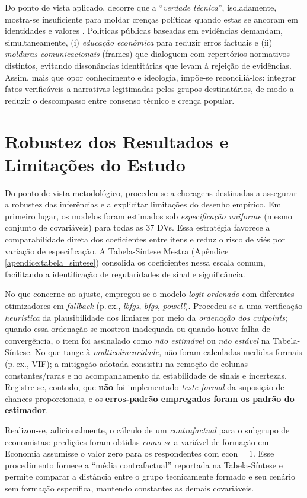 Do ponto de vista aplicado, decorre que a ``\textit{verdade técnica}'', isoladamente, mostra-se insuficiente para moldar crenças políticas quando estas se ancoram em identidades e valores \cite{westen2007political}. Políticas públicas baseadas em evidências demandam, simultaneamente, (i) \textit{educação econômica} para reduzir erros factuais e (ii) \textit{molduras comunicacionais} (frames) que dialoguem com repertórios normativos distintos, evitando dissonâncias identitárias que levam à rejeição de evidências. Assim, mais que opor conhecimento e ideologia, impõe-se reconciliá-los: integrar fatos verificáveis a narrativas legitimadas pelos grupos destinatários, de modo a reduzir o descompasso entre consenso técnico e crença popular.

\section{Robustez dos Resultados e Limitações do Estudo}
Do ponto de vista metodológico, procedeu-se a checagens destinadas a assegurar a robustez das inferências e a explicitar limitações do desenho empírico. Em primeiro lugar, os modelos foram estimados sob \textit{especificação uniforme} (mesmo conjunto de covariáveis) para todas as 37 DVs. Essa estratégia favorece a comparabilidade direta dos coeficientes entre itens e reduz o risco de viés por variação de especificação. A Tabela-Síntese Mestra (Apêndice \autoref{apendice:tabela_sintese}) consolida os coeficientes nessa escala comum, facilitando a identificação de regularidades de sinal e significância.

No que concerne ao ajuste, empregou-se o modelo \textit{logit ordenado} com diferentes otimizadores em \textit{fallback} (p.\,ex., \textit{lbfgs}, \textit{bfgs}, \textit{powell}). Procedeu-se a uma verificação \textit{heurística} da plausibilidade dos limiares por meio da \textit{ordenação dos cutpoints}; quando essa ordenação se mostrou inadequada ou quando houve falha de convergência, o item foi assinalado como \textit{não estimável} ou \textit{não estável} na Tabela-Síntese. No que tange à \textit{multicolinearidade}, não foram calculadas medidas formais (p.\,ex., VIF); a mitigação adotada consistiu na remoção de colunas constantes/raras e no acompanhamento da estabilidade de sinais e incertezas. Registre-se, contudo, que \textbf{não} foi implementado \textit{teste formal} da suposição de chances proporcionais, e os \textbf{erros-padrão empregados foram os padrão do estimador}.

Realizou-se, adicionalmente, o cálculo de um \textit{contrafactual} para o subgrupo de economistas: predições foram obtidas \textit{como se} a variável de formação em Economia assumisse o valor zero para os respondentes com \(\mathrm{econ}=1\). Esse procedimento fornece a ``média contrafactual'' reportada na Tabela-Síntese e permite comparar a distância entre o grupo tecnicamente formado e seu cenário sem formação específica, mantendo constantes as demais covariáveis.

